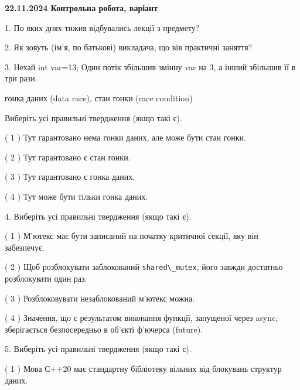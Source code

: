 \documentclass[12pt, ukrainian]{article}
\def\code#1{\Verb!#1!}
\begin{document}
\vspace{4mm}
\newpage
\begin {large}

\textbf{22.11.2024 Контрольна робота, варіант  }\par


{
1. По яких днях тижня відбувались лекції з предмету?



\vspace{5mm}
2. Як зовуть (ім'я, по батькові) викладача, що вів практичні заняття?



\vspace{5mm}
3. Нехай int var=13; Один потік збільшив змінну var на 3, а інший збільшив її в три рази.

гонка даних (data race), стан гонки (race condition)

Виберіть усі правильні твердження (якщо такі є).\par
\vspace{2mm}
( 1 ) Тут гарантовано нема гонки даних, але може бути стан гонки.%

( 2 ) Тут гарантовано є стан гонки.%

( 3 ) Тут гарантовано є гонка даних.%

( 4 ) Тут може бути тільки гонка даних.%


\vspace{5mm}
4. Виберіть усі правильні твердження (якщо такі є).\par
\vspace{2mm}

( 1 ) М’ютекс має бути записаний на початку критичної секції, яку він забезпечує.%

( 2 ) Щоб розблокувати заблокований \code{shared\_mutex}, його завжди достатньо розблокувати один раз.%

( 3 ) Розблоковувати незаблокований м’ютекс можна.%

( 4 ) Значення, що є результатом виконання функції, запущеної через async, зберігається безпосередньо в об’єкті ф’ючерса (future).%


\vspace{5mm}
5. Виберіть усі правильні твердження (якщо такі є).\par
\vspace{2mm}

( 1 ) Мова С++20 має стандартну бібліотеку вільних від блокувань структур даних.%

}
\end{large}
\end{document}
